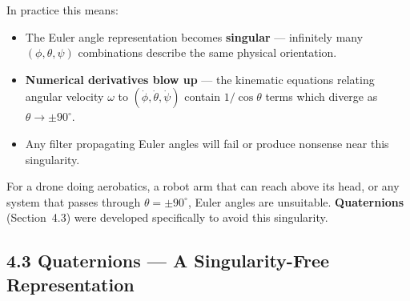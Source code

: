 \documentclass[12pt, a4paper]{article}
\begin{document}
\begin{warnbox}
  In practice this means:
  \begin{itemize}[leftmargin=1.2em, itemsep=2pt]
    \item The Euler angle representation becomes \textbf{singular} ---
      infinitely many $(\phi, \theta, \psi)$ combinations describe the same
      physical orientation.
    \item \textbf{Numerical derivatives blow up} --- the kinematic equations
      relating angular velocity $\omega$ to $(\dot\phi, \dot\theta, \dot\psi)$
      contain $1/\cos\theta$ terms which diverge as $\theta \to \pm90^\circ$.
    \item Any filter propagating Euler angles will fail or produce nonsense
      near this singularity.
  \end{itemize}

  For a drone doing aerobatics, a robot arm that can reach above its head,
  or any system that passes through $\theta = \pm90^\circ$, Euler angles
  are unsuitable.
  \textbf{Quaternions} (Section~4.3) were developed specifically to avoid
  this singularity.
\end{warnbox}

\subsection*{4.3 \quad Quaternions --- A Singularity-Free Representation}
\end{document}
